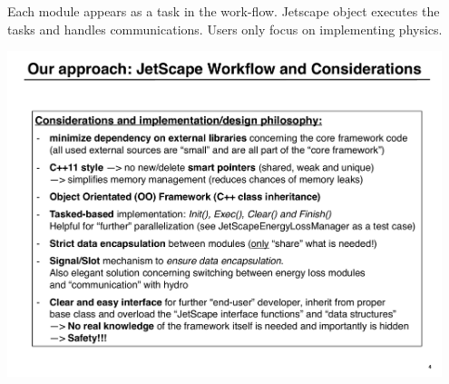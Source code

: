 \documentclass[11pt]{beamer}
\begin{document}
\begin{frame}
\begin{overprint}
 Each module appears as a task in the work-flow. Jetscape object executes the tasks and handles communications. 
 Users only focus on implementing physics.
\end{overprint}
\begin{center}
\includegraphics[width=0.95\textwidth]{./talks/p6.pdf}
\end{center}
\end{frame}
\end{document}
